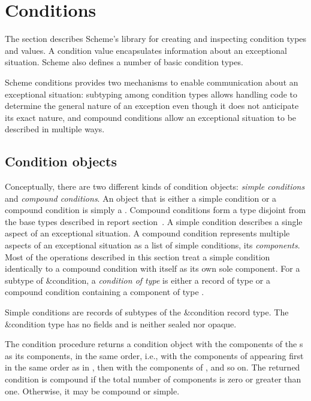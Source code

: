 \section{Conditions}
\label{conditionssection}

The section describes Scheme's  library 
for creating and inspecting
condition types and values. A condition value encapsulates information
about an exceptional situation.
Scheme also defines a
number of basic condition types.

Scheme conditions provides two mechanisms to enable communication
about an exceptional situation: subtyping among condition types allows
handling code to determine the general nature of an exception even
though it does not anticipate its exact nature, and compound
conditions allow an exceptional situation to be described in multiple
ways.

\subsection{Condition objects}

Conceptually, there are two different kinds of condition objects:
\textit{simple conditions} and
\textit{compound conditions}.  An object
that is either a simple condition or a compound condition is 
simply a .  Compound conditions form a type disjoint
from the base types described in report
section~.  A simple condition
describes a single aspect of an exceptional situation.  A compound
condition represents multiple aspects of an exceptional situation as a
list of simple conditions, its \textit{components}.  Most of the
operations described in this section treat a simple condition
identically to a compound condition with itself as its own sole component.  For a
subtype  of {\cf\&condition}, a \textit{condition of type
  } is either a record of type  or a compound condition
containing a component of type .

\begin{entry}{%
}

Simple conditions are records of subtypes of the {\cf\&condition}
record type.  The {\cf\&condition} type has no fields and is neither sealed nor opaque.
\end{entry}

\begin{entry}{%
}

The {\cf condition}
procedure returns a condition object with the components of the
s as its components, in the same order, i.e., with the
components of  appearing first in the same order as in
, then with the components of , and so on.  The
returned condition is compound if the total number of components is
zero or greater than one.  Otherwise, it may be compound or simple.
\end{entry}


